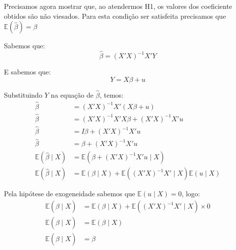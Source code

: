 \documentclass[]{ufpe-exercises}
\begin{document}
\begin{questions}
\begin{solution}
		Precisamos agora mostrar que, ao atendermos H1, os valores dos coeficiente obtidos são não viesados. Para esta condição ser satisfeita precisamos que \(\mathbb{E}(\hat{\beta}) = \beta\)

		Sabemos que:
		\[\hat{\beta} = (X'X)^{-1}X'Y\]

		E sabemos que:
		\[Y = X\beta + u\]

		Substituindo \(Y\) na equação de \(\hat{\beta}\), temos:
		\begin{align*}
			\hat{\beta}                    & = (X'X)^{-1}X'(X\beta + u)                                                        \\
			\hat{\beta}                    & = (X'X)^{-1}X'X\beta + (X'X)^{-1}X'u                                              \\
			\hat{\beta}                    & = I\beta + (X'X)^{-1}X'u                                                          \\
			\hat{\beta}                    & = \beta + (X'X)^{-1}X'u                                                           \\
			\mathbb{E}(\hat{\beta} \mid X) & = \mathbb{E}(\beta + (X'X)^{-1}X'u \mid X)                                        \\
			\mathbb{E}(\hat{\beta} \mid X) & = \mathbb{E}(\beta \mid X) + \mathbb{E}((X'X)^{-1}X' \mid X) \mathbb{E}(u \mid X)
		\end{align*}

		Pela hipótese de exogeneidade sabemos que \(\mathbb{E}(u \mid X) = 0\), logo:
		\begin{align*}
			\mathbb{E}(\hat{\beta} \mid X) & = \mathbb{E}(\beta \mid X) + \mathbb{E}((X'X)^{-1}X' \mid X) \times 0 \\
			\mathbb{E}(\hat{\beta} \mid X) & = \mathbb{E}(\beta \mid X)                                            \\
			\mathbb{E}(\hat{\beta} \mid X) & = \beta
		\end{align*}

	\end{solution}

\end{questions}
\end{document}
